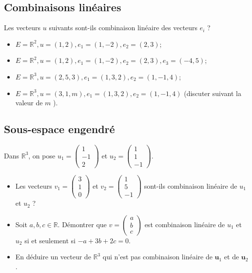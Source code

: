 

\subsection*{Combinaisons linéaires}

Les vecteurs $u$ suivants sont-ils combinaison linéaire des vecteurs $e_i$ ?
\begin{itemize}
    \item $E=\mathbb{R}^2, u=(1,2), e_1=(1,-2), e_2=(2,3)$;
    \item $E=\mathbb{R}^2, u=(1,2), e_1=(1,-2), e_2=(2,3), e_3=(-4,5)$;
    \item $E=\mathbb{R}^3, u=(2,5,3), e_1=(1,3,2), e_2=(1,-1,4)$;
    \item $E=\mathbb{R}^3, u=(3,1, m), e_1=(1,3,2), e_2=(1,-1,4)$ (discuter suivant la valeur de $m$ ).
\end{itemize}

\vspace{3em}
\subsection*{Sous-espace engendré}


Dans $\mathbb{R}^3$, on pose $u_1=\left(\begin{array}{c}1 \\ -1 \\ 2\end{array}\right)$ et $u_2=\left(\begin{array}{c}1 \\ 1 \\ -1\end{array}\right)$.
\begin{itemize}
    \item Les vecteurs $v_1=\left(\begin{array}{l}3 \\ 1 \\ 0\end{array}\right)$ et $v_2=\left(\begin{array}{c}1 \\ 5 \\ -1\end{array}\right)$ sont-ils combinaison linéaire de $u_1$ et $u_2$ ?
    \item Soit $a, b, c \in \mathbb{R}$. Démontrer que $v=\left(\begin{array}{l}a \\ b \\ c\end{array}\right)$ est combinaison linéaire de $u_1$ et $u_2$ si et seulement si $-a+3 b+2 c=0$.
    \item En déduire un vecteur de $\mathbb{R}^3$ qui n'est pas combinaison linéaire de $\boldsymbol{u}_1$ et de $\boldsymbol{u}_2$.
\end{itemize}



